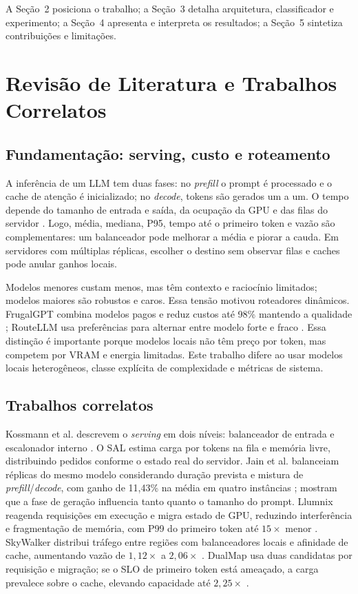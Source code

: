 \documentclass[12pt]{article}
\begin{document}
A Seção~2 posiciona o trabalho; a Seção~3 detalha arquitetura, classificador e experimento; a Seção~4 apresenta e interpreta os resultados; a Seção~5 sintetiza contribuições e limitações.

\section{Revisão de Literatura e Trabalhos Correlatos}

\subsection{Fundamentação: serving, custo e roteamento}

A inferência de um LLM tem duas fases: no \emph{prefill} o prompt é processado e o cache de atenção é inicializado; no \emph{decode}, tokens são gerados um a um. O tempo depende do tamanho de entrada e saída, da ocupação da GPU e das filas do servidor \cite{article:performance_lb,article:llumnix}. Logo, média, mediana, P95, tempo até o primeiro token e vazão são complementares: um balanceador pode melhorar a média e piorar a cauda. Em servidores com múltiplas réplicas, escolher o destino sem observar filas e caches pode anular ganhos locais.

Modelos menores custam menos, mas têm contexto e raciocínio limitados; modelos maiores são robustos e caros. Essa tensão motivou roteadores dinâmicos. FrugalGPT combina modelos pagos e reduz custos até 98\% mantendo a qualidade \cite{article:frugalgpt}; RouteLLM usa preferências para alternar entre modelo forte e fraco \cite{article:routellm}. Essa distinção é importante porque modelos locais não têm preço por token, mas competem por VRAM e energia limitadas. Este trabalho difere ao usar modelos locais heterogêneos, classe explícita de complexidade e métricas de sistema.

\subsection{Trabalhos correlatos}

Kossmann et al. descrevem o \emph{serving} em dois níveis: balanceador de entrada e escalonador interno \cite{article:llm_gpu}. O SAL estima carga por tokens na fila e memória livre, distribuindo pedidos conforme o estado real do servidor. Jain et al. balanceiam réplicas do mesmo modelo considerando duração prevista e mistura de \emph{prefill}/\emph{decode}, com ganho de 11,43\% na média em quatro instâncias \cite{article:performance_lb}; mostram que a fase de geração influencia tanto quanto o tamanho do prompt. Llumnix reagenda requisições em execução e migra estado de GPU, reduzindo interferência e fragmentação de memória, com P99 do primeiro token até $15\times$ menor \cite{article:llumnix}. SkyWalker distribui tráfego entre regiões com balanceadores locais e afinidade de cache, aumentando vazão de $1{,}12\times$ a $2{,}06\times$ \cite{article:skywalker}. DualMap usa duas candidatas por requisição e migração; se o SLO de primeiro token está ameaçado, a carga prevalece sobre o cache, elevando capacidade até $2{,}25\times$ \cite{article:dualmap}.
\end{document}
